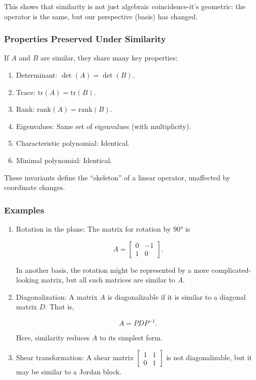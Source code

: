 \documentclass[
  letterpaper,
  DIV=11,
  numbers=noendperiod]{scrreprt}
\providecommand{\tightlist}{%
  \setlength{\itemsep}{0pt}\setlength{\parskip}{0pt}}
\begin{document}
This shows that similarity is not just algebraic coincidence-it's
geometric: the operator is the same, but our perspective (basis) has
changed.

\subsubsection{Properties Preserved Under
Similarity}\label{properties-preserved-under-similarity}

If \(A\) and \(B\) are similar, they share many key properties:

\begin{enumerate}
\def\labelenumi{\arabic{enumi}.}
\tightlist
\item
  Determinant: \(\det(A) = \det(B)\).
\item
  Trace: \(\text{tr}(A) = \text{tr}(B)\).
\item
  Rank: \(\text{rank}(A) = \text{rank}(B)\).
\item
  Eigenvalues: Same set of eigenvalues (with multiplicity).
\item
  Characteristic polynomial: Identical.
\item
  Minimal polynomial: Identical.
\end{enumerate}

These invariants define the ``skeleton'' of a linear operator,
unaffected by coordinate changes.

\subsubsection{Examples}\label{examples-2}

\begin{enumerate}
\def\labelenumi{\arabic{enumi}.}
\item
  Rotation in the plane: The matrix for rotation by 90° is

  \[
  A = \begin{bmatrix} 0 & -1 \\ 1 & 0 \end{bmatrix}.
  \]

  In another basis, the rotation might be represented by a more
  complicated-looking matrix, but all such matrices are similar to
  \(A\).
\item
  Diagonalization: A matrix \(A\) is diagonalizable if it is similar to
  a diagonal matrix \(D\). That is,

  \[
  A = PDP^{-1}.
  \]

  Here, similarity reduces \(A\) to its simplest form.
\item
  Shear transformation: A shear matrix
  \(\begin{bmatrix} 1 & 1 \\ 0 & 1 \end{bmatrix}\) is not
  diagonalizable, but it may be similar to a Jordan block.
\end{enumerate}
\end{document}
